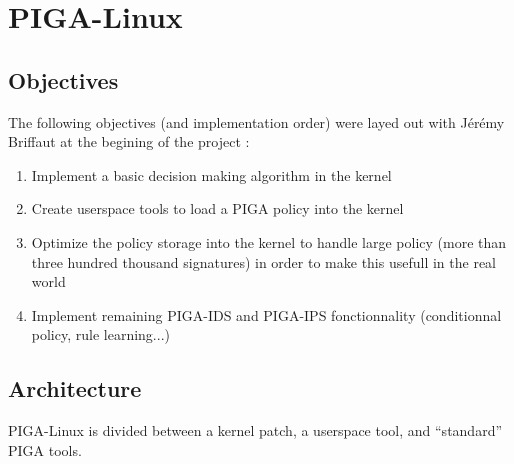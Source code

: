\documentclass[pdftex,a4paper,titlepage,11pt]{article}
\begin{document}






\newpage

\section{PIGA-Linux}

\subsection{Objectives}

The following objectives (and implementation order) were layed out with Jérémy Briffaut at the begining of the project :

\begin{enumerate}
	\item Implement a basic decision making algorithm in the kernel
	\item Create userspace tools to load a PIGA policy into the kernel
	\item Optimize the policy storage into the kernel to handle large policy (more than three hundred thousand signatures) in order to make this usefull in the real world
	\item Implement remaining PIGA-IDS and PIGA-IPS fonctionnality (conditionnal policy, rule learning...)
\end{enumerate}

\subsection{Architecture}

PIGA-Linux is divided between a kernel patch, a userspace tool, and ``standard'' PIGA tools.
\end{document}
